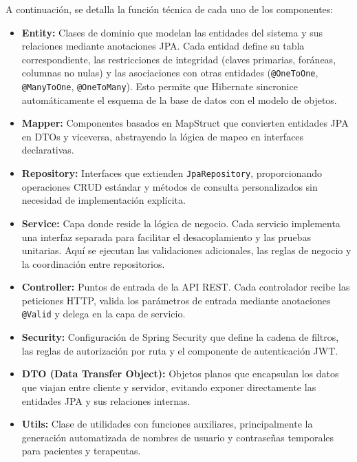 A continuación, se detalla la función técnica de cada uno de los componentes:
\begin{itemize}
    \item \textbf{Entity:} Clases de dominio que modelan las entidades del sistema y sus relaciones mediante anotaciones JPA. Cada entidad define su tabla correspondiente, las restricciones de integridad (claves primarias, foráneas, columnas no nulas) y las asociaciones con otras entidades (\texttt{@OneToOne}, \texttt{@ManyToOne}, \texttt{@OneToMany}). Esto permite que Hibernate sincronice automáticamente el esquema de la base de datos con el modelo de objetos.
    \item \textbf{Mapper:} Componentes basados en MapStruct que convierten entidades JPA en DTOs y viceversa, abstrayendo la lógica de mapeo en interfaces declarativas.
    \item \textbf{Repository:} Interfaces que extienden \texttt{JpaRepository}, proporcionando operaciones CRUD estándar y métodos de consulta personalizados sin necesidad de implementación explícita.
    \item \textbf{Service:} Capa donde reside la lógica de negocio. Cada servicio implementa una interfaz separada para facilitar el desacoplamiento y las pruebas unitarias. Aquí se ejecutan las validaciones adicionales, las reglas de negocio y la coordinación entre repositorios.
    \item \textbf{Controller:} Puntos de entrada de la API REST. Cada controlador recibe las peticiones HTTP, valida los parámetros de entrada mediante anotaciones \texttt{@Valid} y delega en la capa de servicio.
    \item \textbf{Security:} Configuración de Spring Security que define la cadena de filtros, las reglas de autorización por ruta y el componente de autenticación JWT.
    \item \textbf{DTO (Data Transfer Object):} Objetos planos que encapsulan los datos que viajan entre cliente y servidor, evitando exponer directamente las entidades JPA y sus relaciones internas.
    \item \textbf{Utils:} Clase de utilidades con funciones auxiliares, principalmente la generación automatizada de nombres de usuario y contraseñas temporales para pacientes y terapeutas.
\end{itemize}


